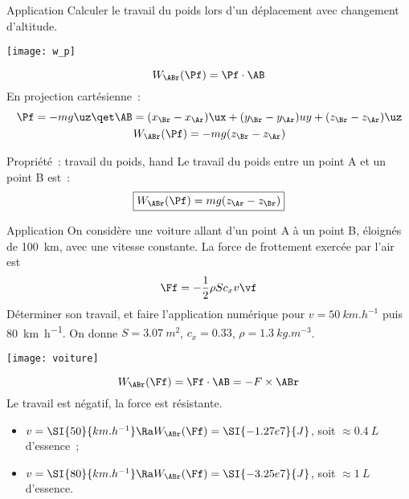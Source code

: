 \documentclass[../main/main.tex]{subfiles}
\begin{document}
\begin{rexem}{Application}
    Calculer le travail du poids lors d'un déplacement avec changement
    d'altitude.
    \tcblower
    \begin{minipage}{0.20\linewidth}
        \begin{center}
            \texttt{[image: w\_p]}
        \end{center}
    \end{minipage}
    \hfill
    \begin{minipage}{.75\linewidth}
        \[W_{\ABr}(\Pf) = \Pf\cdot\AB\]
        En projection cartésienne~:
        \begin{gather*}
            \Pf = -mg\uz
            \qet
            \AB = (x_\Br-x_\Ar)\ux + (y_\Br - y_\Ar)uy + (z_\Br - z_\Ar)\uz
            \\
            W_{\ABr}(\Pf) = -mg(z_\Br - z_\Ar)
        \end{gather*}
    \end{minipage}
\end{rexem}

\begin{tprop}{Propriété~: travail du poids, hand}
    Le travail du poids entre un point A et un point B est~:
    \[\boxed{W_\ABr(\Pf) = mg(z_\Ar - z_\Br)}\]
\end{tprop}

\begin{rexem}{Application}
    On considère une voiture allant d'un point A à un point B, éloignés de
    \SI{100}{km}, avec une vitesse constante. La force de frottement exercée par
    l'air est
    \[\Ff = -\frac{1}{2}\rho Sc_xv\vf\]
    Déterminer son travail, et faire l'application
    numérique pour $v = \SI{50}{km.h^{-1}}$ puis \SI{80}{km.h^{-1}}. On donne $S
    = \SI{3.07}{m^2}$, $c_x = \num{0.33}$, $\rho = \SI{1.3}{kg.m^{-3}}$. 
    \tcblower
    \begin{minipage}{0.45\linewidth}
        \begin{center}
            \texttt{[image: voiture]}
        \end{center}
    \end{minipage}
    \hfill
    \begin{minipage}{0.45\linewidth}
        \[W_{\ABr}(\Ff) = \Ff\cdot\AB = -F\times\ABr\]
        Le travail est négatif, la force est résistante.
        \begin{itemize}
            \item $v = \SI{50}{km.h^{-1}} \Ra W_{\ABr}(\Ff) = \SI{-1.27e7}{J}$,
                soit $\approx \SI{0.4}{L}$ d'essence~;
            \item $v = \SI{80}{km.h^{-1}} \Ra W_{\ABr}(\Ff) = \SI{-3.25e7}{J}$,
                soit $\approx \SI{1}{L}$ d'essence.
        \end{itemize}
    \end{minipage}
\end{rexem}
\end{document}
